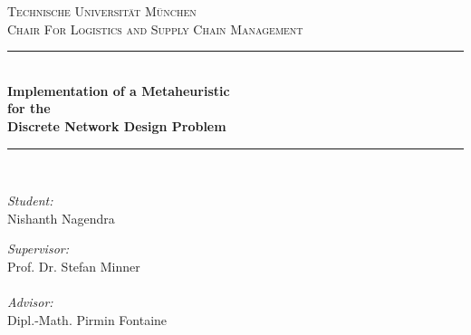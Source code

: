 \documentclass[a4paper, 12pt]{article}
\begin{document}
\begin{titlepage}

\newcommand{\HRule}{\rule{135mm}{0.5mm}} %

\center %


\textsc{\LARGE Technische Universit{\"a}t M{\"u}nchen}\\[1.5cm] %
\textsc{\Large Chair For Logistics and Supply Chain Management}\\[0.5cm] %

\vspace{48mm}
\HRule \\[0.4cm]
{ \Large \bfseries Implementation of a Metaheuristic\\for the\\Discrete Network Design Problem}\\[0.5cm] %
\HRule \\[1.5cm]

\vspace{48mm}
\begin{minipage}{0.4\textwidth}
\begin{flushleft} \large
\emph{Student:}\\
Nishanth Nagendra %
\end{flushleft}
\end{minipage}
\begin{minipage}{0.4\textwidth} 
\begin{flushright} \large
\emph{Supervisor:} \\
Prof. Dr. Stefan Minner \\~\\ %
\emph{Advisor:} \\
Dipl.-Math. Pirmin Fontaine %
\end{flushright}
\end{minipage}\\[2cm]


\end{titlepage}
\end{document}
